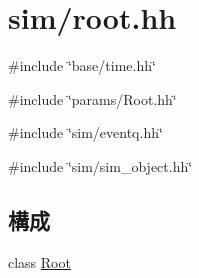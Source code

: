 \hypertarget{root_8hh}{
\section{sim/root.hh}
\label{root_8hh}
}
{\ttfamily \#include \char`\"{}base/time.hh\char`\"{}}\par
{\ttfamily \#include \char`\"{}params/Root.hh\char`\"{}}\par
{\ttfamily \#include \char`\"{}sim/eventq.hh\char`\"{}}\par
{\ttfamily \#include \char`\"{}sim/sim\_\-object.hh\char`\"{}}\par
\subsection*{構成}
\begin{DoxyCompactItemize}
\item 
class \hyperlink{classRoot}{Root}
\end{DoxyCompactItemize}
